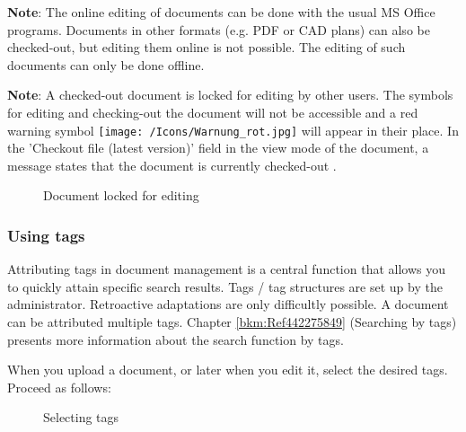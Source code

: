 
\textbf{Note}: The online editing of documents can be done with the usual MS Office programs. Documents in other formats (e.g. PDF or CAD plans) can also be checked-out, but editing them online is not possible. The editing of such documents can only be done offline. \newline


\textbf{Note}: A checked-out document is locked for editing by other users. The symbols for editing and checking-out the document will not be accessible and a red warning symbol \texttt{[image: /Icons/Warnung\_rot.jpg]}  will appear in their place. In the 'Checkout file (latest version)' field in the view mode of the document, a message states that the document is currently checked-out .

\begin{figure}[H]
\caption{Document locked for editing}
\end{figure}

\subsubsection{Using tags}
\label{bkm:Ref201801219}

Attributing tags in document management is a central function that allows you to quickly attain specific search results. Tags / tag structures are set up by the administrator. Retroactive adaptations are only difficultly possible. A document can be attributed multiple tags. Chapter \ref{bkm:Ref442275849} (Searching by tags) presents more information about the search function by tags. \newline

\vspace{\baselineskip}

When you upload a document, or later when you edit it, select the desired tags. Proceed as follows: 

\begin{figure}[H]
\caption{Selecting tags}
\end{figure}

